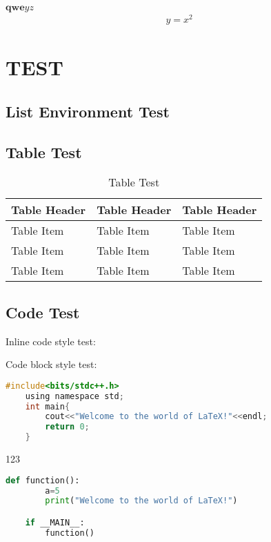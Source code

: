 \documentclass[cn,blue,homework]{mdocs}
\begin{document}
\maketitle
{}
$\bm{qwe}yz$
\begin{align}
    y=x^2
\end{align}

\lipsum[1-8]
\section{TEST}
\lipsum[1-8]
\subsection{List Environment Test}
\lipsum[1]
\begin{itemlist}
    \item \lipsum[1]
    \item \lipsum[1]
    \item \lipsum[1]
\end{itemlist}

\lipsum[1]
\begin{numlist}
    \item \lipsum[1]
    \item \lipsum[1]
    \item \lipsum[1]
\end{numlist}
\subsection{Table Test}
\begin{table}[H]
    \centering
    \begin{tabular}{lll}
        \toprule
        Table Header & Table Header & Table Header\\
        \midrule
        Table Item & Table Item & Table Item\\
        Table Item & Table Item & Table Item\\
        Table Item & Table Item & Table Item\\
        \bottomrule
    \end{tabular}
    \caption{Table Test}
\end{table}
\subsection{Code Test}
Inline code style test:


Code block style test:
\begin{lstlisting}[language=C]
    #include<bits/stdc++.h>
    using namespace std;
    int main{
        cout<<"Welcome to the world of LaTeX!"<<endl;
        return 0;
    }
\end{lstlisting}
123
\begin{lstlisting}[language=Python]
    def function():
        a=5
        print("Welcome to the world of LaTeX!")

    if __MAIN__:
        function()
\end{lstlisting}
\end{document}
